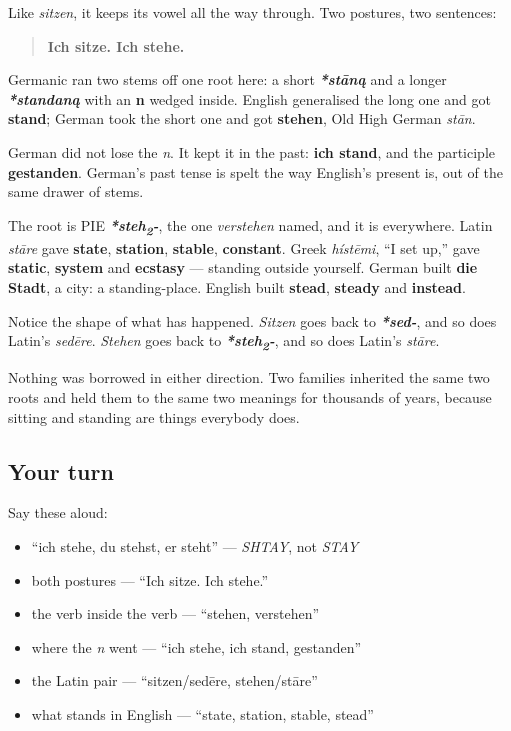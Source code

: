 Like \emph{sitzen}, it keeps its vowel all the way through. Two postures, two sentences:

\begin{quote}
\textbf{Ich sitze. Ich stehe.}
\end{quote}

\begin{cousinweb}
Germanic ran two stems off one root here: a short \emph{\textbf{*stāną}} and a longer \emph{\textbf{*standaną}} with an \textbf{n} wedged inside. English generalised the long one and got \textbf{stand}; German took the short one and got \textbf{stehen}, Old High German \emph{stān}.

German did not lose the \emph{n}. It kept it in the past: \textbf{ich stand}, and the participle \textbf{gestanden}. German's past tense is spelt the way English's present is, out of the same drawer of stems.

The root is PIE \emph{\textbf{*steh\textsubscript{2}-}}, the one \emph{verstehen} named, and it is everywhere. Latin \emph{stāre} gave \textbf{state}, \textbf{station}, \textbf{stable}, \textbf{constant}. Greek \emph{hístēmi}, \textquotedblleft{}I set up,\textquotedblright{} gave \textbf{static}, \textbf{system} and \textbf{ecstasy} — standing outside yourself. German built \textbf{die Stadt}, a city: a standing-place. English built \textbf{stead}, \textbf{steady} and \textbf{instead}.
\end{cousinweb}

\begin{culture}
Notice the shape of what has happened. \emph{Sitzen} goes back to \emph{\textbf{*sed-}}, and so does Latin's \emph{sedēre}. \emph{Stehen} goes back to \emph{\textbf{*steh\textsubscript{2}-}}, and so does Latin's \emph{stāre}.

Nothing was borrowed in either direction. Two families inherited the same two roots and held them to the same two meanings for thousands of years, because sitting and standing are things everybody does.
\end{culture}

\subsection*{Your turn}
Say these aloud:

\begin{itemize}
\raggedright
  \item \textquotedblleft{}ich stehe, du stehst, er steht\textquotedblright{} — \emph{SHTAY}, not \emph{STAY}
  \item both postures — \textquotedblleft{}Ich sitze. Ich stehe.\textquotedblright{}
  \item the verb inside the verb — \textquotedblleft{}stehen, verstehen\textquotedblright{}
  \item where the \emph{n} went — \textquotedblleft{}ich stehe, ich stand, gestanden\textquotedblright{}
  \item the Latin pair — \textquotedblleft{}sitzen/sedēre, stehen/stāre\textquotedblright{}
  \item what stands in English — \textquotedblleft{}state, station, stable, stead\textquotedblright{}
\end{itemize}

